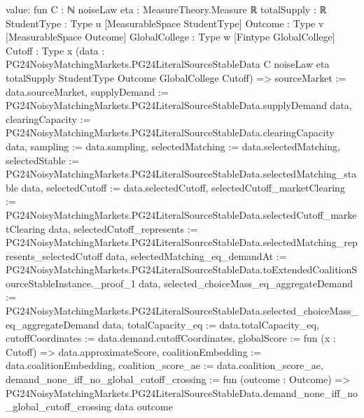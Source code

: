 \documentclass[10pt]{article}
\begin{document}
\begin{ReviewVerbatim}
value:
fun {C : ℕ} {noiseLaw eta : MeasureTheory.Measure ℝ} {totalSupply : ℝ} {StudentType : Type u}
    [MeasurableSpace StudentType] {Outcome : Type v} [MeasurableSpace Outcome] {GlobalCollege : Type w}
    [Fintype GlobalCollege] {Cutoff : Type x}
    (data :
      PG24NoisyMatchingMarkets.PG24LiteralSourceStableData C noiseLaw eta totalSupply StudentType Outcome GlobalCollege
        Cutoff) =>
  { sourceMarket := data.sourceMarket,
    supplyDemand := PG24NoisyMatchingMarkets.PG24LiteralSourceStableData.supplyDemand data,
    clearingCapacity := PG24NoisyMatchingMarkets.PG24LiteralSourceStableData.clearingCapacity data,
    sampling := data.sampling, selectedMatching := data.selectedMatching,
    selectedStable := PG24NoisyMatchingMarkets.PG24LiteralSourceStableData.selectedMatching_stable data,
    selectedCutoff := data.selectedCutoff,
    selectedCutoff_marketClearing :=
      PG24NoisyMatchingMarkets.PG24LiteralSourceStableData.selectedCutoff_marketClearing data,
    selectedCutoff_represents :=
      PG24NoisyMatchingMarkets.PG24LiteralSourceStableData.selectedMatching_represents_selectedCutoff data,
    selectedMatching_eq_demandAt :=
      PG24NoisyMatchingMarkets.PG24LiteralSourceStableData.toExtendedCoalitionSourceStableInstance._proof_1 data,
    selected_choiceMass_eq_aggregateDemand :=
      PG24NoisyMatchingMarkets.PG24LiteralSourceStableData.selected_choiceMass_eq_aggregateDemand data,
    totalCapacity_eq := data.totalCapacity_eq, cutoffCoordinates := data.demand.cutoffCoordinates,
    globalScore := fun (x : Cutoff) => data.approximateScore, coalitionEmbedding := data.coalitionEmbedding,
    coalition_score_ae := data.coalition_score_ae,
    demand_none_iff_no_global_cutoff_crossing := fun (outcome : Outcome) =>
      PG24NoisyMatchingMarkets.PG24LiteralSourceStableData.demand_none_iff_no_global_cutoff_crossing data outcome }
\end{ReviewVerbatim}
\end{document}
